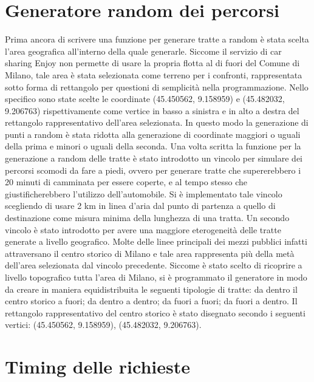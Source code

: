 \section{Generatore random dei percorsi}

Prima ancora di scrivere una funzione per generare tratte a random è stata scelta l'area geografica all'interno della quale generarle. Siccome il servizio di car sharing Enjoy non permette di usare la propria flotta al di fuori del Comune di Milano, tale area è stata selezionata come terreno per i confronti, rappresentata sotto forma di rettangolo per questioni di semplicità nella programmazione. Nello specifico sono state scelte le coordinate (45.450562\textdegree, 9.158959\textdegree) e (45.482032\textdegree, 9.206763\textdegree) rispettivamente come vertice in basso a sinistra e in alto a destra del rettangolo rappresentativo dell'area selezionata. In questo modo la generazione di punti a random è stata ridotta alla generazione di coordinate maggiori o uguali della prima e minori o uguali della seconda. Una volta scritta la funzione per la generazione a random delle tratte è stato introdotto un vincolo per simulare dei percorsi scomodi da fare a piedi, ovvero per generare tratte che supererebbero i 20 minuti di camminata per essere coperte, e al tempo stesso che giustificherebbero l'utilizzo dell'automobile. Si è implementato tale vincolo scegliendo di usare 2 km in linea d'aria dal punto di partenza a quello di destinazione come misura minima della lunghezza di una tratta. Un secondo vincolo è stato introdotto per avere una maggiore eterogeneità delle tratte generate a livello geografico. Molte delle linee principali dei mezzi pubblici infatti attraversano il centro storico di Milano e tale area rappresenta più della metà dell'area selezionata dal vincolo precedente. Siccome è stato scelto di ricoprire a livello topografico tutta l'area di Milano, si è programmato il generatore in modo da creare in maniera equidistribuita le seguenti tipologie di tratte: da dentro il centro storico a fuori; da dentro a dentro; da fuori a fuori; da fuori a dentro. Il rettangolo rappresentativo del centro storico è stato disegnato secondo i seguenti vertici: (45.450562\textdegree, 9.158959\textdegree), (45.482032\textdegree, 9.206763\textdegree).

\section{Timing delle richieste}

